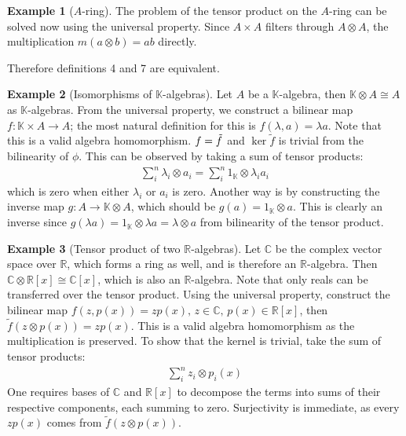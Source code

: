 \documentclass[svgnames]{article}
\theoremstyle{definition}
\newtheorem*{Example*}{Example}
\theoremstyle{remark}
\theoremstyle{underline}
\theoremstyle{underline}
\let\Im\relax
\DeclareMathOperator{\Im}{Im}
\begin{document}
	\begin{Example*}[$A$-ring]
		The problem of the tensor product on the $A$-ring can be solved now using the universal property. Since $A \times A$ filters through $A \otimes A$, the multiplication $m(a \otimes b) = ab$ directly.
	\end{Example*}

	Therefore definitions 4 and 7 are equivalent.
	
	\begin{Example*}[Isomorphisms of $\mathbb K$-algebras]
		Let $A$ be a $\mathbb K$-algebra, then $\mathbb K \otimes A \cong A$ as $\mathbb K$-algebras. From the universal property, we construct a bilinear map $f \colon \mathbb K \times A \to A$; the most natural definition for this is $f(\lambda, a) = \lambda a$. Note that this is a valid algebra homomorphism. $\Im f = \Im \tilde f$ and $\ker \tilde f$ is trivial from the bilinearity of $\phi$. This can be observed by taking a sum of tensor products:
		\begin{gather*}
			\sum_i^n \lambda_i \otimes a_i = \sum_i^n 1_{\mathbb K} \otimes \lambda_i a_i	
		\end{gather*}
		which is zero when either $\lambda_i$ or $a_i$ is zero. Another way is by constructing the inverse map $g \colon A \to \mathbb K \otimes A $, which should be $g(a) = 1_{\mathbb K} \otimes a$. This is clearly an inverse since $g(\lambda a) = 1_{\mathbb K} \otimes \lambda a = \lambda \otimes a$ from bilinearity of the tensor product.
	\end{Example*}

	\begin{Example*}[Tensor product of two $\mathbb R$-algebras]
		Let $\mathbb C$ be the complex vector space over $\mathbb R$, which forms a ring as well, and is therefore an $\mathbb R$-algebra. Then $\mathbb C \otimes \mathbb R[x] \cong \mathbb C[x]$, which is also an $\mathbb R$-algebra. Note that only reals can be transferred over the tensor product.
		Using the universal property, construct the bilinear map $f(z, p(x)) = zp(x),\, z \in \mathbb C,\, p(x) \in \mathbb R[x]$, then $\tilde f(z \otimes p(x)) = zp(x)$. This is a valid algebra homomorphism as the multiplication is preserved. To show that the kernel is trivial, take the sum of tensor products:
		\begin{gather*}
			\sum_i^n z_i \otimes p_i(x)
		\end{gather*}
		One requires bases of $\mathbb C$ and $\mathbb R[x]$ to decompose the terms into sums of their respective components, each summing to zero. Surjectivity is immediate, as every $zp(x)$ comes from $\tilde f(z \otimes p(x))$.
	\end{Example*}
\end{document}
